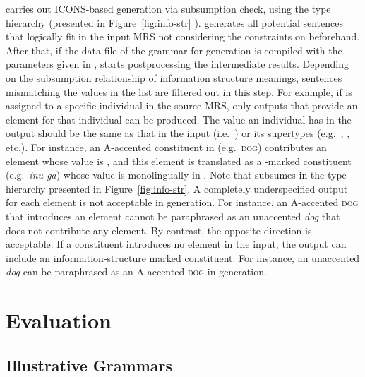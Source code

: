 \isi{\ace} carries out ICONS-based generation via subsumption check,
using the type hierarchy  (presented in
Figure~\ref{fig:info-str} ).
\isi{\ace} generates all potential sentences that logically fit in the
input MRS not considering the constraints on 
beforehand. After that, if the data file of the grammar for generation
is compiled with the parameters given in ,
\isi{\ace} starts postprocessing the intermediate results.  Depending
on the subsumption relationship of information structure meanings,
sentences mismatching the values in the  list are filtered
out in this step.  For example, if  is assigned to
a specific individual in the source MRS, only outputs that
provide an  element for that individual can be
produced. The  value an individual
has in the output should be the same as that in the input
(i.e.\ ) or its supertypes (e.g.\ ,
, etc.). For instance, an A-accented constituent in
 (e.g.\ \textsc{dog}) contributes an  element whose
value is , and this element is translated as a
\ga-marked constituent (e.g.\ \textit{inu ga}) whose value is
monolingually  in . Note that
 subsumes  in the type hierarchy
presented in Figure~\ref{fig:info-str}. A
completely underspecified output for each  element is not
acceptable in generation.
For instance, an A-accented \textsc{dog}
that introduces an  element cannot be paraphrased as an
unaccented \textit{dog} that does not contribute any 
element. By contrast, the opposite direction is
acceptable.  If a constituent introduces no  element in the
input, the output can include an information-structure marked
constituent. For instance, an unaccented \textit{dog} can be
paraphrased as an A-accented \textsc{dog} in generation.






\section{Evaluation}
\label{13:sec:evaluation}


\subsection{Illustrative Grammars}
\label{13:ssec:grammars}

